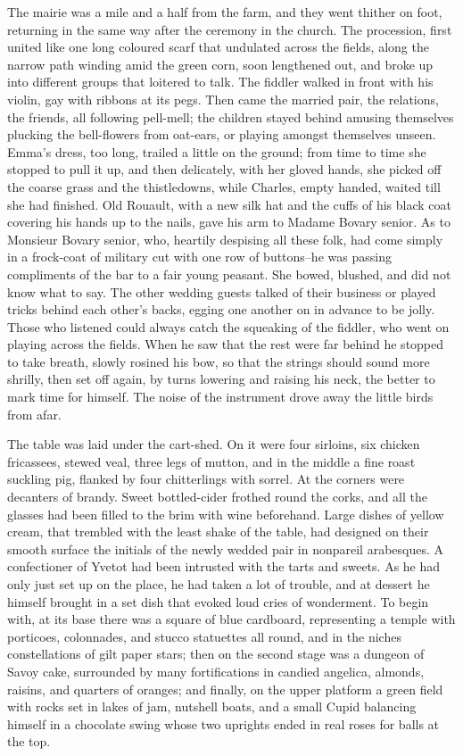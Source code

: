 \documentclass{tufte-book}
\begin{document}
The mairie was a mile and a half from the farm, and they went thither
on foot, returning in the same way after the ceremony in the church.
The procession, first united like one long coloured scarf that undulated
across the fields, along the narrow path winding amid the green corn,
soon lengthened out, and broke up into different groups that loitered to
talk. The fiddler walked in front with his violin, gay with ribbons at
its pegs. Then came the married pair, the relations, the friends, all
following pell-mell; the children stayed behind amusing themselves
plucking the bell-flowers from oat-ears, or playing amongst themselves
unseen. Emma's dress, too long, trailed a little on the ground; from
time to time she stopped to pull it up, and then delicately, with her
gloved hands, she picked off the coarse grass and the thistledowns,
while Charles, empty handed, waited till she had finished. Old Rouault,
with a new silk hat and the cuffs of his black coat covering his hands
up to the nails, gave his arm to Madame Bovary senior. As to Monsieur
Bovary senior, who, heartily despising all these folk, had come simply
in a frock-coat of military cut with one row of buttons--he was passing
compliments of the bar to a fair young peasant. She bowed, blushed,
and did not know what to say. The other wedding guests talked of their
business or played tricks behind each other's backs, egging one another
on in advance to be jolly. Those who listened could always catch the
squeaking of the fiddler, who went on playing across the fields. When
he saw that the rest were far behind he stopped to take breath, slowly
rosined his bow, so that the strings should sound more shrilly, then set
off again, by turns lowering and raising his neck, the better to mark
time for himself. The noise of the instrument drove away the little
birds from afar.

The table was laid under the cart-shed. On it were four sirloins, six
chicken fricassees, stewed veal, three legs of mutton, and in the middle
a fine roast suckling pig, flanked by four chitterlings with sorrel. At
the corners were decanters of brandy. Sweet bottled-cider frothed round
the corks, and all the glasses had been filled to the brim with wine
beforehand. Large dishes of yellow cream, that trembled with the least
shake of the table, had designed on their smooth surface the initials of
the newly wedded pair in nonpareil arabesques. A confectioner of Yvetot
had been intrusted with the tarts and sweets. As he had only just set up
on the place, he had taken a lot of trouble, and at dessert he himself
brought in a set dish that evoked loud cries of wonderment. To begin
with, at its base there was a square of blue cardboard, representing a
temple with porticoes, colonnades, and stucco statuettes all round, and
in the niches constellations of gilt paper stars; then on the second
stage was a dungeon of Savoy cake, surrounded by many fortifications
in candied angelica, almonds, raisins, and quarters of oranges; and
finally, on the upper platform a green field with rocks set in lakes of
jam, nutshell boats, and a small Cupid balancing himself in a chocolate
swing whose two uprights ended in real roses for balls at the top.
\end{document}
